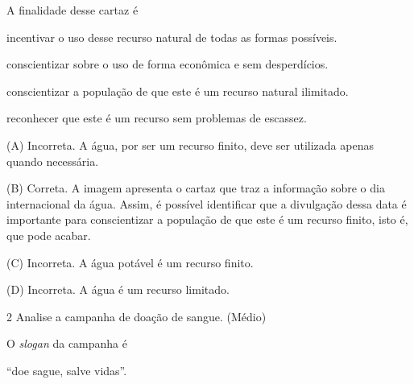 \begin{escolha}
\begin{escolha}

A finalidade desse cartaz é

\begin{escolha}
\item incentivar o uso desse recurso natural de todas as formas possíveis.

\item conscientizar sobre o uso de forma econômica e sem desperdícios.

\item conscientizar a população de que este é um recurso natural ilimitado.

\item reconhecer que este é um recurso sem problemas de escassez.
\end{escolha}



(A) Incorreta. A água, por ser um recurso finito, deve ser utilizada
apenas quando necessária.

(B) Correta. A imagem apresenta o cartaz que traz a informação sobre o
dia internacional da água. Assim, é possível identificar que a
divulgação dessa data é importante para conscientizar a população de que
este é um recurso finito, isto é, que pode acabar.

(C) Incorreta. A água potável é um recurso finito.

(D) Incorreta. A água é um recurso limitado.

\num{2} Analise a campanha de doação de sangue. (Médio)


O \emph{slogan} da campanha é

\begin{escolha}
\item ``doe sague, salve vidas''.


\end{escolha}
\end{escolha}
\end{escolha}
